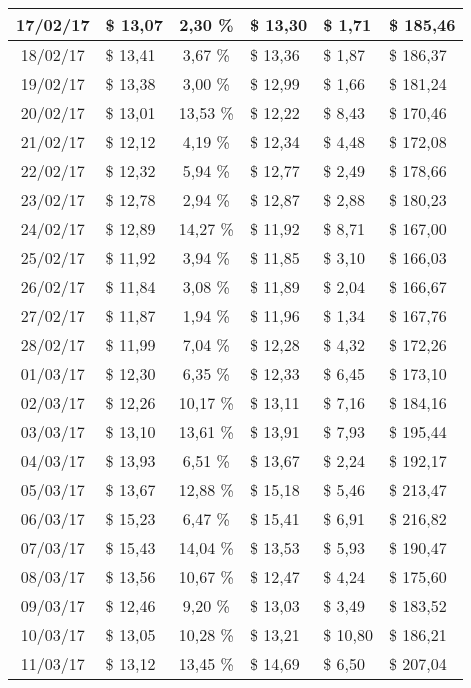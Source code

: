 \begin{center}
\begin{small}
\begin{longtable}{|c|l|c|l|l|l|}
17/02/17 & \$ 13,07 & 2,30 \% & \$ 13,30 & \$ 1,71 & \$ 185,46 \\ \hline
18/02/17 & \$ 13,41 & 3,67 \% & \$ 13,36 & \$ 1,87 & \$ 186,37 \\ \hline
19/02/17 & \$ 13,38 & 3,00 \% & \$ 12,99 & \$ 1,66 & \$ 181,24 \\ \hline
20/02/17 & \$ 13,01 & 13,53 \% & \$ 12,22 & \$ 8,43 & \$ 170,46 \\ \hline
21/02/17 & \$ 12,12 & 4,19 \% & \$ 12,34 & \$ 4,48 & \$ 172,08 \\ \hline
22/02/17 & \$ 12,32 & 5,94 \% & \$ 12,77 & \$ 2,49 & \$ 178,66 \\ \hline
23/02/17 & \$ 12,78 & 2,94 \% & \$ 12,87 & \$ 2,88 & \$ 180,23 \\ \hline
24/02/17 & \$ 12,89 & 14,27 \% & \$ 11,92 & \$ 8,71 & \$ 167,00 \\ \hline
25/02/17 & \$ 11,92 & 3,94 \% & \$ 11,85 & \$ 3,10 & \$ 166,03 \\ \hline
26/02/17 & \$ 11,84 & 3,08 \% & \$ 11,89 & \$ 2,04 & \$ 166,67 \\ \hline
27/02/17 & \$ 11,87 & 1,94 \% & \$ 11,96 & \$ 1,34 & \$ 167,76 \\ \hline
28/02/17 & \$ 11,99 & 7,04 \% & \$ 12,28 & \$ 4,32 & \$ 172,26 \\ \hline
01/03/17 & \$ 12,30 & 6,35 \% & \$ 12,33 & \$ 6,45 & \$ 173,10 \\ \hline
02/03/17 & \$ 12,26 & 10,17 \% & \$ 13,11 & \$ 7,16 & \$ 184,16 \\ \hline
03/03/17 & \$ 13,10 & 13,61 \% & \$ 13,91 & \$ 7,93 & \$ 195,44 \\ \hline
04/03/17 & \$ 13,93 & 6,51 \% & \$ 13,67 & \$ 2,24 & \$ 192,17 \\ \hline
05/03/17 & \$ 13,67 & 12,88 \% & \$ 15,18 & \$ 5,46 & \$ 213,47 \\ \hline
06/03/17 & \$ 15,23 & 6,47 \% & \$ 15,41 & \$ 6,91 & \$ 216,82 \\ \hline
07/03/17 & \$ 15,43 & 14,04 \% & \$ 13,53 & \$ 5,93 & \$ 190,47 \\ \hline
08/03/17 & \$ 13,56 & 10,67 \% & \$ 12,47 & \$ 4,24 & \$ 175,60 \\ \hline
09/03/17 & \$ 12,46 & 9,20 \% & \$ 13,03 & \$ 3,49 & \$ 183,52 \\ \hline
10/03/17 & \$ 13,05 & 10,28 \% & \$ 13,21 & \$ 10,80 & \$ 186,21 \\ \hline
11/03/17 & \$ 13,12 & 13,45 \% & \$ 14,69 & \$ 6,50 & \$ 207,04 \\ \hline

\end{longtable}
\end{small}
\end{center}
